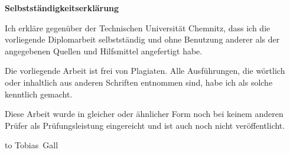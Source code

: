 \centerline{\textbf{\Large Selbstständigkeitserklärung}}

\bigskip

Ich erkläre gegenüber der Technischen Universität Chemnitz, dass ich die
vorliegende Diplomarbeit selbstständig und ohne Benutzung anderer als der
angegebenen Quellen und Hilfsmittel angefertigt habe.

Die vorliegende Arbeit ist frei von Plagiaten. Alle Ausführungen, die wörtlich
oder inhaltlich aus anderen Schriften entnommen sind, habe ich als solche
kenntlich gemacht.

Diese Arbeit wurde in gleicher oder ähnlicher Form noch bei keinem anderen
Prüfer als Prüfungsleistung eingereicht und ist auch noch nicht veröffentlicht.

\vspace*{8ex}

\begin{flushright}
\begin{minipage}{5cm}
\footnotesize
\vbox{\hbox to \hsize{\dotfill}\hbox{\hspace{1em}Tobias Gall}}
\end{minipage}
\end{flushright}
